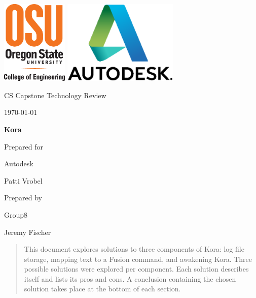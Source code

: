 \documentclass[onecolumn, draftclsnofoot,10pt, compsoc]{IEEEtran}
\def \CapstoneTeamNumber{8}
\def \GroupMemberOne{James Stallkamp}
\def \GroupMemberTwo{Jeremy Fischer}
\def \GroupMemberThree{Austin Row}
\def \CapstoneProjectName{Kora}
\def \CapstoneSponsorCompany{Autodesk}
\def \CapstoneSponsorPerson{Patti Vrobel}
\def \DocType{		
	Technology Review
}
\newcommand{\NameSigPair}[1]{\par
	\makebox[2.75in][r]{#1} \hfil 	\makebox[3.25in]{\makebox[2.25in]{\hrulefill} \hfill		\makebox[.75in]{\hrulefill}}
	\par\vspace{-12pt} \textit{\tiny\noindent
		\makebox[2.75in]{} \hfil		\makebox[3.25in]{\makebox[2.25in][r]{Signature} \hfill	\makebox[.75in][r]{Date}}}}
\renewcommand{\NameSigPair}[1]{#1}
\begin{document}
	\begin{titlepage}
		\begin{singlespace}
			\includegraphics[height=4cm]{coe.eps}
			\includegraphics[height=4cm]{autodesk.eps}   
			\par\vspace{.2in}
			\centering
			\scshape{
				\huge CS Capstone \DocType \par
				{\large\today}\par
				\vspace{.5in}
				\textbf{\Huge\CapstoneProjectName}\par
				\vfill
				{\large Prepared for}\par
				\Huge \CapstoneSponsorCompany\par
				\vspace{5pt}
				{\Large\NameSigPair{\CapstoneSponsorPerson}\par}
				{\large Prepared by }\par
				Group\CapstoneTeamNumber\par
				\vspace{5pt}
				{\Large
					\NameSigPair{\GroupMemberTwo}\par
				}
				\vspace{20pt}
			}
			\begin{abstract}
				This document explores solutions to three components of Kora: log file storage, mapping text to a Fusion command, and awakening Kora.
				Three possible solutions were explored per component. 
				Each solution describes itself and lists its pros and cons.
				A conclusion containing the chosen solution takes place at the bottom of each section.
			\end{abstract}     
		\end{singlespace}
	\end{titlepage}
	\newpage
	\tableofcontents
	\clearpage
\end{document}
